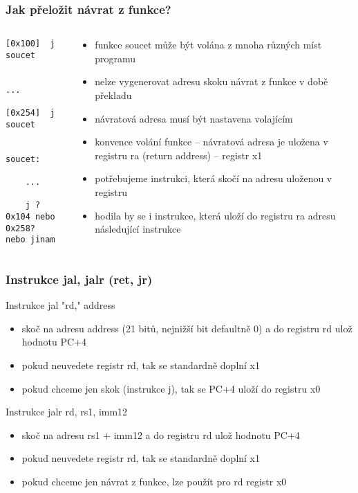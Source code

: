 \documentclass{beamer}
\begin{document}
\begin{frame}[fragile]
\frametitle{Jak přeložit návrat z funkce?}

\begin{columns}
\begin{column}{0.3\textwidth}  
\begin{verbatim}
[0x100]  j  soucet
         
         ...
         
[0x254]  j  soucet
    

soucet:

    ...
    
    j ? 
0x104 nebo 0x258?
nebo jinam
\end{verbatim}
\end{column}
\begin{column}{0.7\textwidth}
\begin{itemize}
 \item funkce soucet může být volána z mnoha různých míst programu
 \item nelze vygenerovat adresu skoku návrat z funkce v době překladu
 \item návratová adresa musí být nastavena volajícím
 \item konvence volání funkce -- návratová adresa je uložena v registru ra (return address) -- registr x1
 \item potřebujeme instrukci, která skočí na adresu uloženou v registru
 \item hodila by se i instrukce, která uloží do registru ra adresu následující instrukce
\end{itemize}
\end{column}
\end{columns}
\end{frame}



\begin{frame}
\frametitle{Instrukce jal, jalr (ret, jr)}

Instrukce jal "rd," address
\begin{itemize}
 \item skoč na adresu address (21 bitů, nejnižší bit defaultně 0) a do registru rd ulož hodnotu PC+4
 \item pokud neuvedete registr rd, tak se standardně doplní x1
 \item pokud chceme jen skok (instrukce j), tak se PC+4 uloží do registru x0
\end{itemize}

Instrukce jalr rd, rs1, imm12
\begin{itemize}
 \item skoč na adresu rs1 + imm12 a do registru rd ulož hodnotu PC+4
 \item pokud neuvedete registr rd, tak se standardně doplní x1
 \item pokud chceme jen návrat z funkce, lze použít pro rd registr x0
\end{itemize}
\end{frame}
\end{document}
